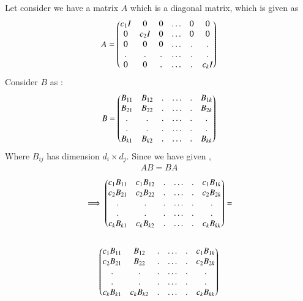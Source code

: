 Let consider we have a matrix $A$ which is a diagonal matrix, which is  given as 
\begin{align}  
	 A =  \begin{pmatrix}
	c_{1}I & 0        & 0  & \dots & 0     & 0 \\ 
	0      &  c_{2}I  & 0  & \dots & 0     & 0 \\ 
	0      &  0       & 0  & \dots & .     & . \\
	.      &  .       & .  & \dots & .     & .  \\
	0     &  0        & .  & \dots & .     & c_{k}I\\ 
\end{pmatrix}
\end{align}
 Consider $B$ as :
 \begin{align}  
 B =  
 \begin{pmatrix}
 B_{11}    & B_{12}   & . & \dots   & . & B_{1k}  \\ 
 B_{21}    & B_{22}   & . & \dots   & . & B_{2k} \\ 
 .         &  .       & . & \dots   & . & . \\
 .         &  .       & . & \dots   & . & .  \\
 B_{k1}    & B_{k2}   & . & \dots   & . & B_{kk} \\
\end{pmatrix}
 \end{align} 
Where $B_{ij}$ has dimension $d_{i} \times d_{j}$. Since  we have given ,
\begin{align}
AB = BA
\end{align}
\begin{multline}
\implies   \begin{pmatrix}
c_1B_{11}    & c_1B_{12}   & . & \dots   & . & c_1B_{1k}  \\ 
c_2B_{21}    &c_2 B_{22}   & . & \dots   & . & c_2B_{2k} \\ 
.         &  .       & . & \dots   & . & . \\
.         &  .       & . & \dots   & . & .  \\
c_kB_{k1}    & c_kB_{k2}   & . & \dots   & . & c_kB_{kk} \\
\end{pmatrix} =  \\ \\ \begin{pmatrix}
c_1B_{11}    & B_{12}   & . & \dots   & . & c_1B_{1k}  \\ 
c_2B_{21}    & B_{22}   & . & \dots   & . &c_2 B_{2k} \\ 
.         &  .       & . & \dots   & . & . \\
.         &  .       & . & \dots   & . & .  \\
c_kB_{k1}    & c_kB_{k2}   & . & \dots   & . & c_kB_{kk} \\
\end{pmatrix} \label{eq:solutions/6/2/14/2.4}
\end{multline}
